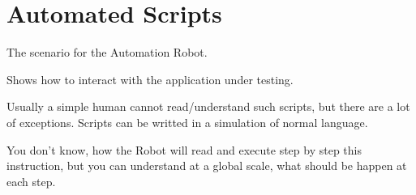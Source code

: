 \section{Automated Scripts}
\label{sec:Automated Scripts}
The scenario for the Automation Robot.

Shows how to interact with the application under testing.

Usually a simple human cannot read/understand such scripts, but there are a lot of exceptions. Scripts can be writted in a simulation of normal language. 

You don't know, how the Robot will read and execute step by step this instruction, but you can understand at a global scale, what should be happen at each step.